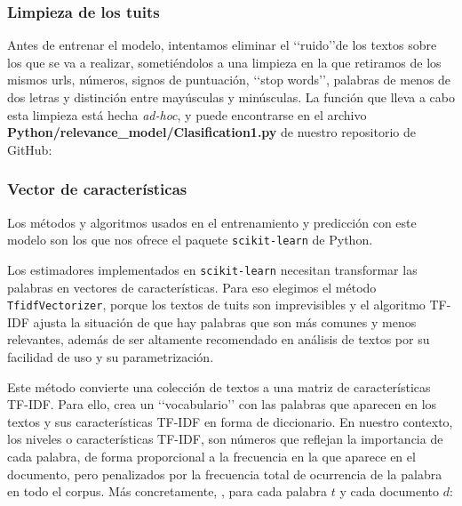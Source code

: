 \subsubsection{Limpieza de los tuits}
Antes de entrenar el modelo, intentamos eliminar el \lq\lq ruido\rq\rq de los textos 
sobre los que se va a realizar, sometiéndolos a una limpieza en la que retiramos
de los mismos urls, números, signos de puntuación, \lq\lq stop words\rq\rq, palabras de menos
de dos letras y distinción entre mayúsculas y minúsculas.
La función que lleva a cabo esta limpieza está hecha {\em ad-hoc}, y puede encontrarse en el
archivo {\bf Python/relevance\_model/Clasification1.py} de nuestro repositorio de GitHub:

\subsubsection{Vector de características}
Los métodos y algoritmos usados 
en el entrenamiento y predicción con este modelo son
los que nos ofrece el paquete {\tt  scikit-learn} de Python. 

Los estimadores implementados en {\tt  scikit-learn}
necesitan transformar las palabras en vectores de características. Para eso elegimos el método {\tt TfidfVectorizer},  porque los textos de tuits son imprevisibles y el algoritmo TF-IDF ajusta la situación de que hay palabras que son más comunes y menos relevantes, además de ser  altamente recomendado en análisis de textos por su facilidad de uso y su parametrización. 
  
Este método convierte una colección de textos
a una matriz de características TF-IDF. Para ello, crea un  \lq\lq vocabulario\rq\rq 
con las palabras que aparecen en los textos y sus características TF-IDF en forma de diccionario.
En nuestro contexto, los niveles o características TF-IDF, son números que reflejan la 
importancia de cada palabra, de forma proporcional a la frecuencia en la que
aparece en el documento, pero  penalizados por la frecuencia total de ocurrencia 
de la palabra en todo el corpus. Más concretamente, \cite{notas_alvaro}, 
para cada palabra $t$ y cada documento $d$:

